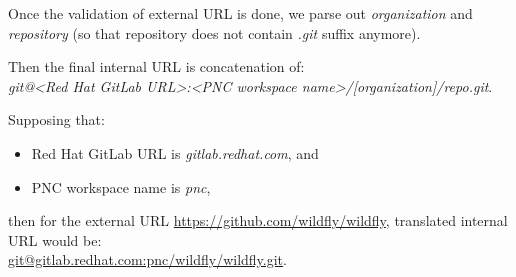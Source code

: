 \documentclass[../main.tex]{subfiles}
\begin{document}
Once the validation of external URL is done, we parse out \textit{organization} and \textit{repository} (so that repository does not contain \textit{.git} suffix anymore).

Then the final internal URL is concatenation of:\\
\textit{git@<Red Hat GitLab URL>:<PNC workspace name>/[organization]/repo.git}.

Supposing that:
\begin{itemize}
    \item Red Hat GitLab URL is \textit{gitlab.redhat.com}, and

    \item PNC workspace name is \textit{pnc},
\end{itemize}

then for the external URL \url{https://github.com/wildfly/wildfly}, translated internal URL would be:\\
\url{git@gitlab.redhat.com:pnc/wildfly/wildfly.git}.
\end{document}
